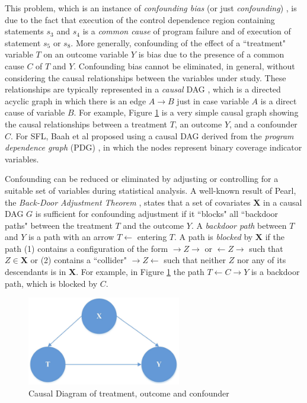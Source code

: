 This problem, which is an instance of {\it confounding bias} (or just {\it confounding}) \cite{pearl2000models}, is due to the fact that execution of the control dependence region \cite{ball1993s} containing statements $s_3$ and $s_4$ is a {\it common cause} of program failure and of execution of statement $s_5$ or $s_8$.  More generally, confounding of the effect of a ``treatment" variable $T$ on an outcome variable $Y$ is bias due to the presence of a common cause $C$ of $T$ and $Y$.  Confounding bias cannot be eliminated, in general, without considering the causal relationships between the variables under study.  These relationships are typically represented in a {\it causal} DAG \cite{pearl2000models}, which is a directed acyclic graph in which there is an edge $A \rightarrow B$ just in case variable $A$ is a direct cause of variable $B$.  For example, Figure \ref{fig2.2} is a very simple causal graph showing the causal relationships between a treatment $T$, an outcome $Y$, and a confounder $C$.  For SFL, Baah et al \cite{baah2010causal,baah2011mitigating} proposed using a causal DAG derived from the {\it program dependence graph} (PDG) \cite{ferrante1987program}, in which the nodes represent binary coverage indicator variables.

Confounding can be reduced or eliminated by adjusting or controlling for a suitable set of variables during statistical analysis.  A well-known result of Pearl, the {\it Back-Door Adjustment Theorem} \cite{pearl2000models}, states that a set of covariates $\mathbf{X}$ in a causal DAG $G$ is sufficient for confounding adjustment if it ``blocks" all ``backdoor paths" between the treatment $T$ and the outcome $Y$.  A {\it backdoor path} between $T$ and $Y$ is a path with an arrow $T \leftarrow$ entering $T$.  A path is {\it blocked} by $\pmb{X}$ if the path (1) contains a configuration of the form $\rightarrow Z \rightarrow$ or $\leftarrow Z \rightarrow$ such that  $Z \in \mathbf{X}$ or (2) contains a ``collider" $\rightarrow Z \leftarrow$  such that neither $Z$ nor any of its descendants is in $\mathbf{X}$.  For example, in Figure \ref{fig2.2} the path $T \leftarrow C \rightarrow Y$ is a backdoor path, which is blocked by $C$.

\begin{figure}[htb!]
\vspace{0em}
\begin{center}
\includegraphics[width=0.6\textwidth]{chapter2_CausalDAG1.pdf}
\vspace {0em}\caption{Causal Diagram of treatment, outcome and confounder} \label{fig2.2}
\end{center}
\vspace {0em}
\end{figure}

